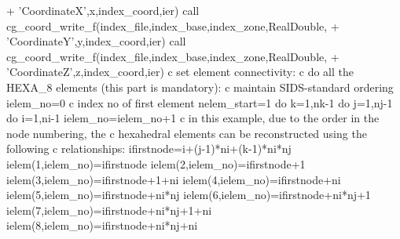 \documentclass[12pt]{article}
\begin{document}
{\newline + \indent 'CoordinateX',x,index\_coord,ier)
\newline\indent      call cg\_coord\_write\_f(index\_file,index\_base,index\_zone,RealDouble,
\newline + \indent 'CoordinateY',y,index\_coord,ier)
\newline\indent      call cg\_coord\_write\_f(index\_file,index\_base,index\_zone,RealDouble,
\newline + \indent 'CoordinateZ',z,index\_coord,ier)
\newline c  set element connectivity:
\newline c  do all the HEXA\_8 elements (this part is mandatory):
\newline c  maintain SIDS-standard ordering
\newline\indent   ielem\_no=0
\newline c  index no of first element
\newline\indent      nelem\_start=1
\newline\indent   do k=1,nk-1
\newline\indent\indent   do j=1,nj-1
\newline\indent\indent\indent   do i=1,ni-1
\newline\indent\indent\indent\indent     ielem\_no=ielem\_no+1
\newline c  in this example, due to the order in the node numbering, the
\newline c  hexahedral elements can be reconstructed using the following
\newline c  relationships:
\newline\indent\indent\indent\indent     ifirstnode=i+(j-1)*ni+(k-1)*ni*nj
\newline\indent\indent\indent\indent     ielem(1,ielem\_no)=ifirstnode
\newline\indent\indent\indent\indent     ielem(2,ielem\_no)=ifirstnode+1
\newline\indent\indent\indent\indent     ielem(3,ielem\_no)=ifirstnode+1+ni
\newline\indent\indent\indent\indent     ielem(4,ielem\_no)=ifirstnode+ni
\newline\indent\indent\indent\indent     ielem(5,ielem\_no)=ifirstnode+ni*nj
\newline\indent\indent\indent\indent     ielem(6,ielem\_no)=ifirstnode+ni*nj+1
\newline\indent\indent\indent\indent     ielem(7,ielem\_no)=ifirstnode+ni*nj+1+ni
\newline\indent\indent\indent\indent     ielem(8,ielem\_no)=ifirstnode+ni*nj+ni
}
\end{document}
